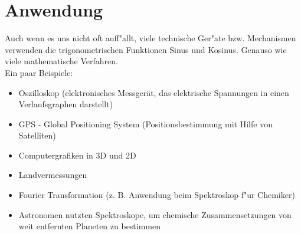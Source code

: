 \documentclass{standalone}
\begin{document}
\section{Anwendung}
Auch wenn es uns nicht oft auff{"a}llt, viele technische Ger{"a}te bzw. Mechanismen verwenden die trigonometrischen Funktionen Sinus und Kosinus. Genauso wie viele mathematische Verfahren.\\
\noindent Ein paar Beispiele:

\vspace{-\topsep}
\begin{itemize}
  \setlength{\parskip}{0pt}
  \setlength{\itemsep}{0pt plus 1pt}
  \item Oszilloskop (elektronisches Messgerät, das elektrische Spannungen in einen Verlaufsgraphen darstellt) 
  \item GPS - Global Positioning System (Positionsbestimmung mit Hilfe von Satelliten)
  \item Computergrafiken in 3D und 2D
  \item Landvermessungen
  \item Fourier Transformation (z. B. Anwendung beim Spektroskop f{"u}r Chemiker)
  \item Astronomen nutzten Spektroskope, um chemische Zusammensetzungen von weit entfernten Planeten zu bestimmen
\end{itemize}
\vspace{-\topsep}
\end{document}
